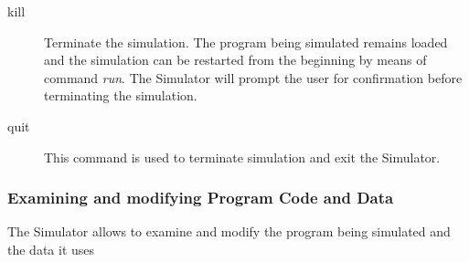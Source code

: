 \documentclass[a4paper,twoside]{tceusermanual}
\begin{document}
\begin{description}
\item[kill] %
  Terminate the simulation.  The program being simulated remains loaded and
  the simulation can be restarted from the beginning by means of command
  \emph{run}.  The Simulator will prompt the user for confirmation
  before terminating the simulation.

\item[quit] %
  This command is used to terminate simulation and exit the Simulator.
\end{description}

\subsubsection{Examining and modifying Program Code and Data}
\label{ssec:debug-data}

The Simulator allows to examine and modify the program being simulated and
the data it uses
\end{document}
